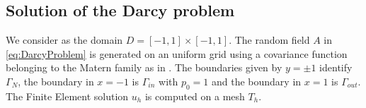 \subsection{Solution of the Darcy problem}

We consider as the domain $D = [-1,1] \times [-1,1]$. The random field $A$ in \eqref{eq:DarcyProblem} is generated on an uniform grid using a covariance function belonging to the Matern family as in \cite{Nobile2015}. The boundaries given by $y = \pm 1$ identify $\Gamma_N$, the boundary in $x = -1$ is $\Gamma_{in}$ with $p_0 = 1$ and the boundary in $x = 1$ is $\Gamma_{out}$. The Finite Element solution $u_h$ is computed on a mesh $T_h$.
